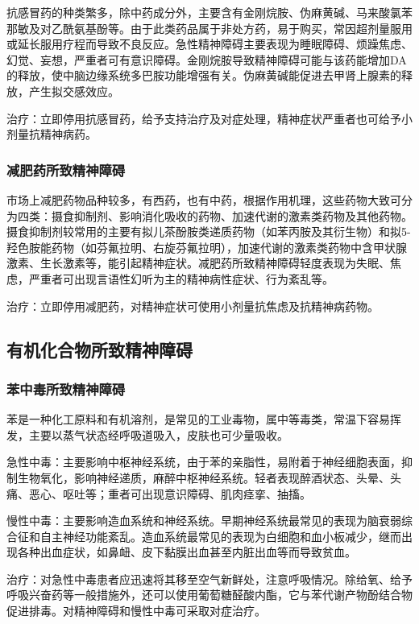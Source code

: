 抗感冒药的种类繁多，除中药成分外，主要含有金刚烷胺、伪麻黄碱、马来酸氯苯那敏及对乙酰氨基酚等。由于此类药品属于非处方药，易于购买，常因超剂量服用或延长服用疗程而导致不良反应。急性精神障碍主要表现为睡眠障碍、烦躁焦虑、幻觉、妄想，严重者可有意识障碍。金刚烷胺导致精神障碍可能与该药能增加DA的释放，使中脑边缘系统多巴胺功能增强有关。伪麻黄碱能促进去甲肾上腺素的释放，产生拟交感效应。

治疗：立即停用抗感冒药，给予支持治疗及对症处理，精神症状严重者也可给予小剂量抗精神病药。

\subsubsection{减肥药所致精神障碍}

市场上减肥药物品种较多，有西药，也有中药，根据作用机理，这些药物大致可分为四类：摄食抑制剂、影响消化吸收的药物、加速代谢的激素类药物及其他药物。摄食抑制剂较常用的主要有拟儿茶酚胺类递质药物（如苯丙胺及其衍生物）和拟5-羟色胺能药物（如芬氟拉明、右旋芬氟拉明），加速代谢的激素类药物中含甲状腺激素、生长激素等，能引起精神症状。减肥药所致精神障碍轻度表现为失眠、焦虑，严重者可出现言语性幻听为主的精神病性症状、行为紊乱等。

治疗：立即停用减肥药，对精神症状可使用小剂量抗焦虑及抗精神病药物。

\subsection{有机化合物所致精神障碍}

\subsubsection{苯中毒所致精神障碍}

苯是一种化工原料和有机溶剂，是常见的工业毒物，属中等毒类，常温下容易挥发，主要以蒸气状态经呼吸道吸入，皮肤也可少量吸收。

急性中毒：主要影响中枢神经系统，由于苯的亲脂性，易附着于神经细胞表面，抑制生物氧化，影响神经递质，麻醉中枢神经系统。轻者表现醉酒状态、头晕、头痛、恶心、呕吐等；重者可出现意识障碍、肌肉痉挛、抽搐。

慢性中毒：主要影响造血系统和神经系统。早期神经系统最常见的表现为脑衰弱综合征和自主神经功能紊乱。造血系统最常见的表现为白细胞和血小板减少，继而出现各种出血症状，如鼻衄、皮下黏膜出血甚至内脏出血等而导致贫血。

治疗：对急性中毒患者应迅速将其移至空气新鲜处，注意呼吸情况。除给氧、给予呼吸兴奋药等一般措施外，还可以使用葡萄糖醛酸内酯，它与苯代谢产物酚结合物促进排毒。对精神障碍和慢性中毒可采取对症治疗。

